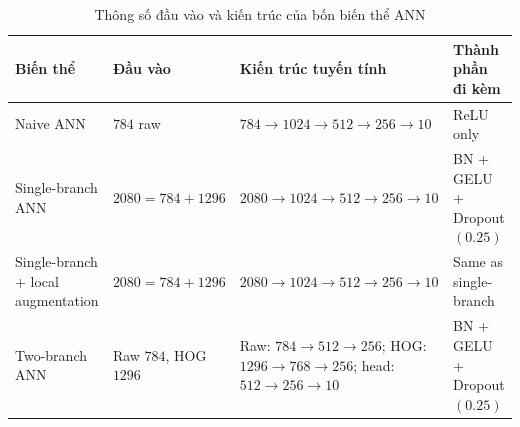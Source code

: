 \begin{table}[H]
\centering
\caption{Thông số đầu vào và kiến trúc của bốn biến thể ANN}
\label{tab:mnist-ann-architecture-details}
\small
\begin{tabularx}{\textwidth}{>{\raggedright\arraybackslash}p{2.8cm} >{\raggedright\arraybackslash}p{2.8cm} >{\raggedright\arraybackslash}X >{\raggedright\arraybackslash}p{3.0cm}}
\toprule
Biến thể & Đầu vào & Kiến trúc tuyến tính & Thành phần đi kèm \\
\midrule
Naive ANN & $784$ raw & $784 \rightarrow 1024 \rightarrow 512 \rightarrow 256 \rightarrow 10$ & ReLU only \\
Single-branch ANN & $2080 = 784 + 1296$ & $2080 \rightarrow 1024 \rightarrow 512 \rightarrow 256 \rightarrow 10$ & BN + GELU + Dropout$(0.25)$ \\
Single-branch + local augmentation & $2080 = 784 + 1296$ & $2080 \rightarrow 1024 \rightarrow 512 \rightarrow 256 \rightarrow 10$ & Same as single-branch \\
Two-branch ANN & Raw $784$, HOG $1296$ & Raw: $784 \rightarrow 512 \rightarrow 256$; HOG: $1296 \rightarrow 768 \rightarrow 256$; head: $512 \rightarrow 256 \rightarrow 10$ & BN + GELU + Dropout$(0.25)$ \\
\bottomrule
\end{tabularx}
\end{table}
